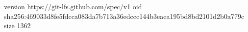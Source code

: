 version https://git-lfs.github.com/spec/v1
oid sha256:469033d8fe5fdcca083da7b713a36edccc144b3eaea195bd8bd2101d2b0a779c
size 1362
